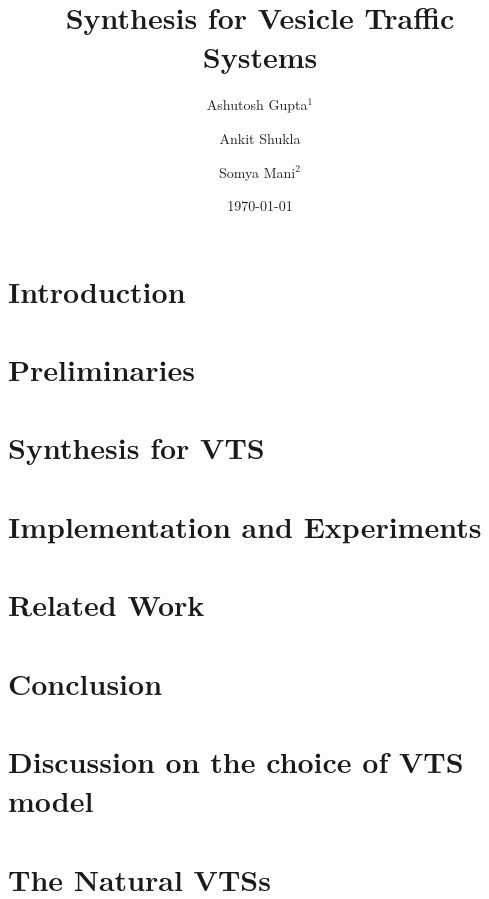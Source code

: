 \documentclass[draft]{llncs}
\begin{document}
\title{Synthesis for Vesicle Traffic Systems}

\author{Ashutosh Gupta$^1$ \and Ankit Shukla \and Somya Mani$^2$}


\date{\today}

\maketitle

\begin{abstract}

\end{abstract}

\section{Introduction}
\label{sec:intro}


% 

\section{Preliminaries}
\label{sec:prelim}


\section{Synthesis for VTS}
\label{sec:encoding}


\section{Implementation and Experiments}
\label{sec:experiments}


\section{Related Work}
\label{sec:related}


\section{Conclusion}
\label{sec:conclusion}





\appendix
\clearpage

\section{Discussion on the choice of VTS model}
\label{sec:model}


\section{The Natural VTSs}
\label{sec:ex-vts}

\end{document}
